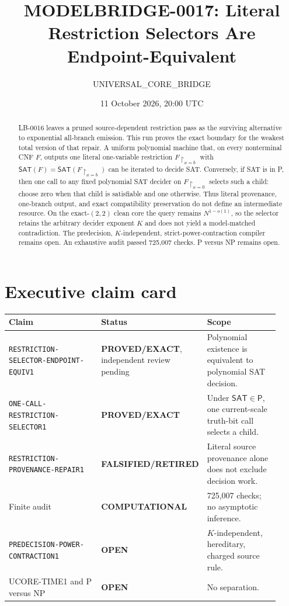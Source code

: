 \documentclass[11pt]{article}
\title{MODELBRIDGE-0017: Literal Restriction Selectors Are Endpoint-Equivalent}
\author{UNIVERSAL\_CORE\_BRIDGE}
\date{11 October 2026, 20:00 UTC}
\newcommand{\SAT}{\mathsf{SAT}}
\newcommand{\EXACT}{\textbf{PROVED/EXACT}}
\newcommand{\OPEN}{\textbf{OPEN}}
\newcommand{\RETIRED}{\textbf{FALSIFIED/RETIRED}}
\newcommand{\COMP}{\textbf{COMPUTATIONAL}}
\begin{document}
\maketitle

\begin{abstract}
LB-0016 leaves a pruned source-dependent restriction pass as the surviving
alternative to exponential all-branch emission.  This run proves the exact
boundary for the weakest total version of that repair.  A uniform polynomial
machine that, on every nonterminal CNF $F$, outputs one literal one-variable
restriction $F\upharpoonright_{x=b}$ with
$\SAT(F)=\SAT(F\upharpoonright_{x=b})$ can be iterated to decide SAT.
Conversely, if SAT is in P, then one call to any fixed polynomial SAT decider
on $F\upharpoonright_{x=0}$ selects such a child: choose zero when that child
is satisfiable and one otherwise.  Thus literal provenance, one-branch
output, and exact compatibility preservation do not define an intermediate
resource.  On the exact-$(2,2)$ clean core the query remains
$N^{1-o(1)}$, so the selector retains the arbitrary decider exponent $K$ and
does not yield a model-matched contradiction.  The predecision,
$K$-independent, strict-power-contraction compiler remains open.  An exhaustive
audit passed 725,007 checks.  P versus NP remains open.
\end{abstract}

\section{Executive claim card}

\begin{center}\small
\begin{tabular}{@{}p{0.42\linewidth}p{0.19\linewidth}p{0.31\linewidth}@{}}
\toprule
Claim & Status & Scope\\ \midrule
\texttt{RESTRICTION-SELECTOR-ENDPOINT-EQUIV1} & \EXACT, independent review pending &
Polynomial existence is equivalent to polynomial SAT decision.\\
\texttt{ONE-CALL-RESTRICTION-SELECTOR1} & \EXACT &
Under $\SAT\in\mathsf P$, one current-scale truth-bit call selects a child.\\
\texttt{RESTRICTION-PROVENANCE-REPAIR1} & \RETIRED &
Literal source provenance alone does not exclude decision work.\\
Finite audit & \COMP & 725,007 checks; no asymptotic inference.\\
\texttt{PREDECISION-POWER-CONTRACTION1} & \OPEN &
$K$-independent, hereditary, charged source rule.\\
UCORE-TIME1 and P versus NP & \OPEN & No separation.\\
\bottomrule
\end{tabular}
\end{center}
\end{document}
